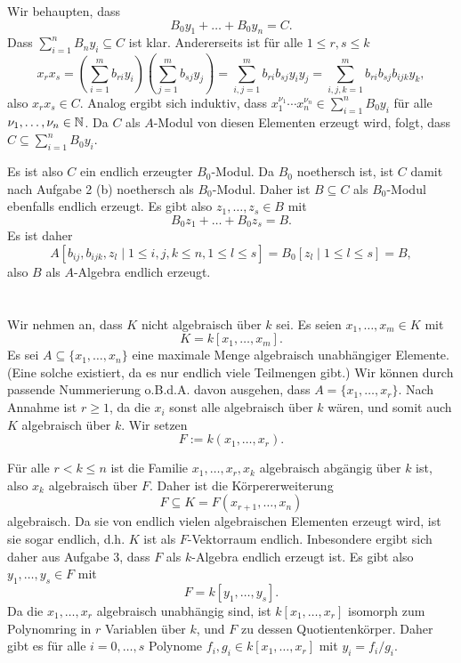 \documentclass[a4paper,10pt]{article}
\begin{document}
Wir behaupten, dass
\[
 B_0 y_1 + \ldots + B_0 y_n = C.
\]
Dass $\sum_{i=1}^n B_n y_i \subseteq C$ ist klar. Andererseits ist für alle $1 \leq r,s \leq k$
\[
 x_r x_s
 = \left( \sum_{i=1}^m b_{ri} y_i \right) \left( \sum_{j=1}^m b_{sj} y_j \right)
 = \sum_{i,j=1}^m b_{ri} b_{sj} y_i y_j
 = \sum_{i,j,k=1}^m b_{ri} b_{sj} b_{ijk} y_k,
\]
also $x_r x_s \in C$. Analog ergibt sich induktiv, dass $x_1^{\nu_1} \cdots x_n^{\nu_n} \in \sum_{i=1}^n B_0 y_i$ für alle $\nu_1, \ldots, \nu_n \in \mathbb{N}$. Da $C$ als $A$-Modul von diesen Elementen erzeugt wird, folgt, dass $C \subseteq \sum_{i=1}^n B_0 y_i$.

Es ist also $C$ ein endlich erzeugter $B_0$-Modul. Da $B_0$ noethersch ist, ist $C$ damit nach Aufgabe 2 (b) noethersch als $B_0$-Modul. Daher ist $B \subseteq C$ als $B_0$-Modul ebenfalls endlich erzeugt. Es gibt also $z_1, \ldots, z_s \in B$ mit
\[
 B_0 z_1 + \ldots + B_0 z_s = B.
\]
Es ist daher
\[
 A[b_{ij}, b_{ijk}, z_l \mid 1 \leq i,j,k \leq n, 1 \leq l \leq s ]
 = B_0 [z_l \mid 1 \leq l \leq s]
 = B,
\]
also $B$ als $A$-Algebra endlich erzeugt.





\section{}
Wir nehmen an, dass $K$ nicht algebraisch über $k$ sei.
Es seien $x_1, \ldots, x_m \in K$ mit
\[
 K = k[x_1, \ldots, x_m].
\]
Es sei $A \subseteq \{x_1, \ldots, x_n\}$ eine maximale Menge algebraisch unabhängiger Elemente. (Eine solche existiert, da es nur endlich viele Teilmengen gibt.) Wir können durch passende Nummerierung o.B.d.A. davon ausgehen, dass $A = \{x_1, \ldots, x_r\}$. Nach Annahme ist $r \geq 1$, da die $x_i$ sonst alle algebraisch über $k$ wären, und somit auch $K$ algebraisch über $k$. Wir setzen
\[
 F := k(x_1, \ldots, x_r).
\]

Für alle $r < k \leq n$ ist die Familie $x_1, \ldots, x_r, x_k$ algebraisch abgängig über $k$ ist, also $x_k$ algebraisch über $F$. Daher ist die Körpererweiterung
\[
 F \subseteq K = F(x_{r+1}, \ldots, x_n)
\]
algebraisch. Da sie von endlich vielen algebraischen Elementen erzeugt wird, ist sie sogar endlich, d.h. $K$ ist als $F$-Vektorraum endlich. Inbesondere ergibt sich daher aus Aufgabe 3, dass $F$ als $k$-Algebra endlich erzeugt ist. Es gibt also $y_1, \ldots, y_s \in F$ mit
\[
 F = k[y_1, \ldots, y_s].
\]
Da die $x_1, \ldots, x_r$ algebraisch unabhängig sind, ist $k[x_1, \ldots, x_r]$ isomorph zum Polynomring in $r$ Variablen über $k$, und $F$ zu dessen Quotientenkörper. Daher gibt es für alle $i = 0, \ldots, s$ Polynome $f_i, g_i \in k[x_1, \ldots, x_r]$ mit $y_i = f_i/g_i$.
\end{document}
